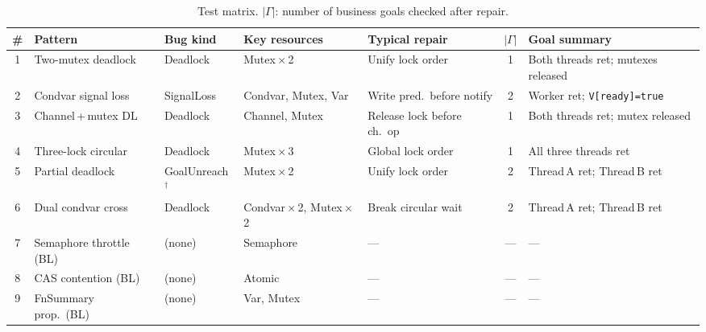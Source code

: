 \begin{table}[t]
\caption{Test matrix.
$|\Gamma|$: number of business goals checked after repair.}
\label{tab:test-matrix}
\centering\footnotesize
\begin{tabular}{@{}cllll c p{2.6cm}@{}}
\toprule
\textbf{\#} & \textbf{Pattern} & \textbf{Bug kind}
  & \textbf{Key resources}
  & \textbf{Typical repair}
  & $|\Gamma|$
  & \textbf{Goal summary} \\
\midrule
1  & Two-mutex deadlock
   & Deadlock & Mutex\,$\times$\,2
   & Unify lock order
   & 1 & Both threads ret; mutexes released \\[2pt]
2  & Condvar signal loss
   & SignalLoss & Condvar, Mutex, Var
   & Write pred.\ before notify
   & 2 & Worker ret; \texttt{V[ready]=true} \\[2pt]
3  & Channel\,+\,mutex DL
   & Deadlock & Channel, Mutex
   & Release lock before ch.\ op
   & 1 & Both threads ret; mutex released \\[2pt]
4  & Three-lock circular
   & Deadlock & Mutex\,$\times$\,3
   & Global lock order
   & 1 & All three threads ret \\[2pt]
5  & Partial deadlock
   & GoalUnreach$^\dagger$ & Mutex\,$\times$\,2
   & Unify lock order
   & 2 & Thread\,A ret; Thread\,B ret \\[2pt]
6  & Dual condvar cross
   & Deadlock & Condvar\,$\times$\,2, Mutex\,$\times$\,2
   & Break circular wait
   & 2 & Thread\,A ret; Thread\,B ret \\[2pt]
\midrule
7  & Semaphore throttle \textsf{(BL)}
   & (none) & Semaphore
   & --- & --- & --- \\[2pt]
8  & CAS contention \textsf{(BL)}
   & (none) & Atomic
   & --- & --- & --- \\[2pt]
9  & FnSummary prop.\ \textsf{(BL)}
   & (none) & Var, Mutex
   & --- & --- & --- \\
\bottomrule
\end{tabular}
\end{table}

